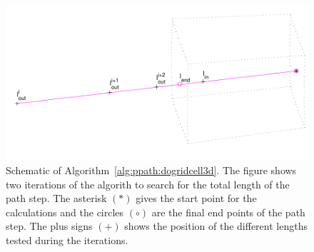 \begin{figure}[!t]
 \begin{center}
  \includegraphics*[width=0.80\hsize]{Figs/ppath/ppath_3Dsearch}
  \caption{Schematic of Algorithm~\ref{alg:ppath:dogridcell3d}. The
    figure shows two iterations of the algorith to search for the
    total length of the path step. The asterisk $(\ast)$ gives the
    start point for the calculations and the circles $(\circ)$ are the
    final end points of the path step. The plus signs $(+)$ shows the
    position of the different lengths tested during the iterations.}
  \label{fig:ppath:3Dsearch}  
 \end{center}
\end{figure}


